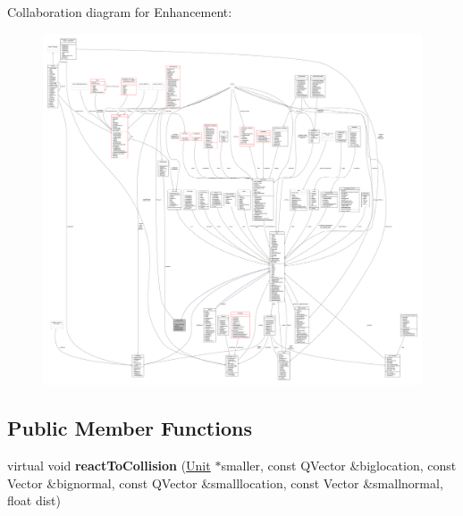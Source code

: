 Collaboration diagram for Enhancement\+:
\nopagebreak
\begin{figure}[H]
\begin{center}
\leavevmode
\includegraphics[width=350pt]{d8/d7d/classEnhancement__coll__graph}
\end{center}
\end{figure}
\subsection*{Public Member Functions}
\begin{DoxyCompactItemize}
\item 
virtual void {\bfseries react\+To\+Collision} (\hyperlink{classUnit}{Unit} $\ast$smaller, const Q\+Vector \&biglocation, const Vector \&bignormal, const Q\+Vector \&smalllocation, const Vector \&smallnormal, float dist)\hypertarget{classEnhancement_a7d3e59478a47db9ee40ea339b655adba}{}\label{classEnhancement_a7d3e59478a47db9ee40ea339b655adba}

\end{DoxyCompactItemize}
